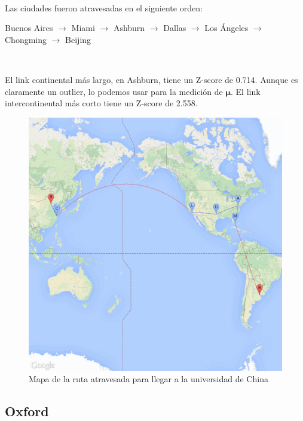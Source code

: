 ~

Las ciudades fueron atravesadas en el siguiente orden:

Buenos Aires $\rightarrow$ Miami $\rightarrow$ Ashburn $\rightarrow$ Dallas $\rightarrow$ Los
\'Angeles $\rightarrow$ Chongming $\rightarrow$ Beijing

~

El link continental m\'as largo, en Ashburn, tiene un Z-score de 0.714. Aunque es claramente un
outlier, lo podemos usar para la medici\'on de $\bm{\mu}$. El link intercontinental m\'as corto
tiene un Z-score de 2.558.

\begin{figure}[H]
	\begin{center}
		  \includegraphics[scale=0.2]{../results/maps/Tsinghua.png}
		  \caption{Mapa de la ruta atravesada para llegar a la universidad de China}
	\end{center}
\end{figure}

\subsection{Oxford}

~

